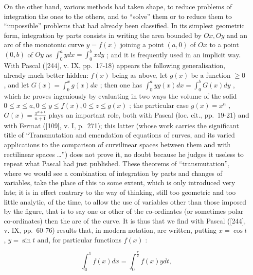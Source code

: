 On the other hand, various methods had taken shape, to reduce problems of integration the ones to the others, and to ``solve'' them or to reduce them to ``impossible'' problems that had already been classified. In its simplest geometric form, integration by parts consists in writing the area bounded by \(Ox, Oy\) and an arc of the monotonic curve \(y = f(x)\) joining a point \((a, 0)\) of \(Ox\) to a point \((0, b)\) of \(Oy\) as \(\int_{0}^{a} ydx = \int_{0}^{b} xdy\) ; and it is frequently used in an implicit way. With Pascal ({[}244{]}, v. IX, pp.~17-18) appears the following generalisation, already much better hidden: \(f(x)\) being as above, let \(g(x)\) be a function \(\geq 0\) , and let \(G(x) = \int_{0}^{x} g(x)dx\) ; then one has \(\int_{0}^{a} yg(x)dx = \int_{0}^{b} G(x)dy\) , which he proves ingeniously by evaluating in two ways the volume of the solid \(0 \leq x \leq a, 0 \leq y \leq f(x), 0 \leq z \leq g(x)\) ; the particular case \(g(x) = x^n\) , \(G(x) = \frac{x^{n+1}}{n+1}\) plays an important role, both with Pascal (loc. cit., pp.~19-21) and with Fermat ({[}109{]}, v. I, p.~271); this latter (whose work carries the significant title of ``Transmutation and emendation of equations of curves, and its varied applications to the comparison of curvilinear spaces between them and with rectilinear spaces \ldots{}'') does not prove it, no doubt because he judges it useless to repeat what Pascal had just published. These theorems of ``transmutation'', where we would see a combination of integration by parts and changes of variables, take the place of this to some extent, which is only introduced very late; it is in effect contrary to the way of thinking, still too geometric and too little analytic, of the time, to allow the use of variables other than those imposed by the figure, that is to say one or other of the co-ordinates (or sometimes polar co-ordinates) then the arc of the curve. It is thus that we find with Pascal ({[}244{]}, v. IX, pp.~60-76) results that, in modern notation, are written, putting \(x = \cos t\) , \(y = \sin t\) and, for particular functions \(f(x)\) :

\[
\int_ {0} ^ {1} f (x) d x = \int_ {0} ^ {\frac {\pi}{2}} f (x) y d t,
\]

